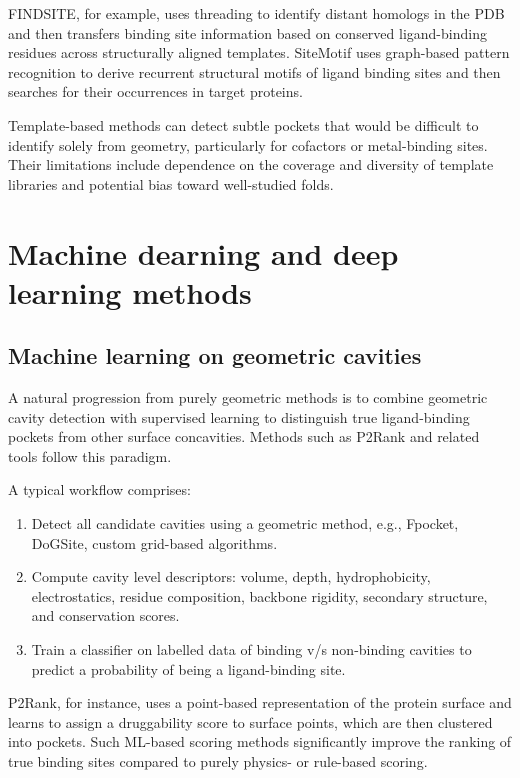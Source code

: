 \documentclass[12pt]{article}
\begin{document}
FINDSITE\cite{CH5_Brylinski2008FINDSITE}, for example, uses threading to identify distant homologs in the PDB and then transfers binding site information based on conserved ligand-binding residues across structurally aligned templates. SiteMotif\cite{CH5_SiteMotif2022} uses graph-based pattern recognition to derive recurrent structural motifs of ligand binding sites and then searches for their occurrences in target proteins.

Template-based methods\cite{CH5_ghersi2011beyond} can detect subtle pockets that would be difficult to identify solely from geometry, particularly for cofactors or metal-binding sites. Their limitations include dependence on the coverage and diversity of template libraries and potential bias toward well-studied folds.

\section{Machine dearning and deep learning methods}

\subsection{Machine learning on geometric cavities}
A natural progression from purely geometric methods is to combine geometric cavity detection with supervised learning to distinguish true ligand-binding pockets from other surface concavities. Methods such as P2Rank\cite{CH5_Krivak2018} and related tools follow this paradigm\cite{CH5_zhao2020exploring}.

A typical workflow comprises:
\begin{enumerate}
    \item Detect all candidate cavities using a geometric method, e.g., Fpocket, DoGSite, custom grid-based algorithms.
    \item Compute cavity level descriptors: volume, depth, hydrophobicity, electrostatics, residue composition, backbone rigidity, secondary structure, and conservation scores.
    \item Train a classifier on labelled data of binding v/s non-binding cavities to predict a probability of being a ligand-binding site.
\end{enumerate}

P2Rank\cite{CH5_Krivak2018}, for instance, uses a point-based representation of the protein surface and learns to assign a druggability score to surface points, which are then clustered into pockets. Such ML-based scoring methods significantly improve the ranking of true binding sites compared to purely physics- or rule-based scoring\cite{CH5_zhao2020exploring,CH5_ghersi2011beyond}.
\end{document}
